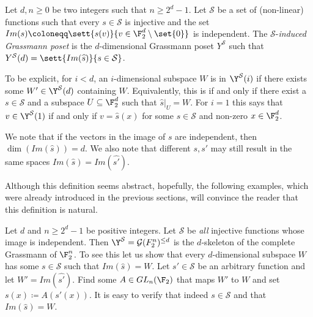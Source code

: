 \begin{definition}
    Let \(d,n \geq 0\) be two integers such that \(n \geq 2^d-1\). Let \(\mathcal{S}\) %
    be a set of (non-linear) functions such that every \(s \in \mathcal{S}\) is injective and the set \( Im(s) \coloneqq \sett{s(v)}{v \in \F_2^d \setminus \set{0}}\) is independent. The \(\mathcal{S}\)-\emph{induced Grassmann poset} is the \(d\)-dimensional Grassmann poset \(Y^{\mathcal{S}}\) such that \(Y^{\mathcal{S}}(d) = \sett{Im(\widehat{s})}{s \in \mathcal{S}}\).
\end{definition}
To be explicit, for \(i < d\), an \(i\)-dimensional subspace \(W\) is in \(\Y^{\mathcal{S}}(i)\) if there exists some \(W' \in \Y^{\mathcal{S}}(d)\) containing \(W\). Equivalently, this is if and only if there exist a \(s \in \mathcal{S}\) and a subspace \(U \subseteq \F_2^d\) such that \(\widehat{s}|_U = W\). For \(i=1\) this says that \(v \in \Y^{\mathcal{S}}(1)\) if and only if \(v=\widehat{s}(x)\) for some \(s \in \mathcal{S}\) and non-zero \(x \in \F_2^d\). 

We note that if the vectors in the image of \(s\) are independent, then \(\dim(Im(\widehat{s})) = d\). We also note that different \(s,s'\) may still result in the same spaces \(Im(\widehat{s}) = Im(\widehat{s'})\).

Although this definition seems abstract, hopefully, the following examples, which were already introduced in the previous sections, will convince the reader that this definition is natural.
\begin{example}
    Let \(d\) and \(n \geq 2^d-1\) be positive integers. Let \(\mathcal{S}\) be \emph{all} injective functions whose image is independent. Then \(\Y^\mathcal{S} = \mathcal{G}(F_2^n)^{\leq d}\) is the \(d\)-skeleton of the complete Grassmann of \(\F_2^n\). To see this let us show that every \(d\)-dimensional subspace \(W\) has some \(s \in \mathcal{S}\) such that \(Im(\widehat{s})=W\). Let \(s' \in \mathcal{S}\) be an arbitrary function and let \(W' = Im(\widehat{s'})\). Find some \(A \in GL_n(\F_2)\) that maps \(W'\) to \(W\) and set \(s(x) \coloneqq A(s'(x))\). It is easy to verify that indeed \(s \in \mathcal{S}\) and that \(Im(\widehat{s}) = W\).
\end{example}

